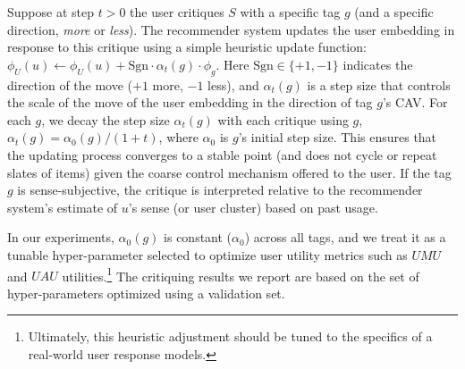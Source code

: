 \documentclass[manuscript,screen,nonacm]{acmart}
\newcommand{\1}{{\mathbf 1}}
\newcommand{\UAU}{\mathit{UAU}}
\newcommand{\UMU}{\mathit{UMU}}
\theoremstyle{TheoremNum}
\begin{document}
Suppose at step $t>0$ the user critiques $S$ with a specific tag $g$ (and a specific direction, \emph{more} or \emph{less}). The recommender system updates the user embedding in response to this critique using a simple heuristic update function: $\phi_U(u) \leftarrow \phi_U(u) + \text{Sgn}\cdot\alpha_t(g) \cdot \phi_g$. Here $\text{Sgn}\in\{+1, -1\}$ indicates the direction of the move ($+1$ more,  $-1$ less), and $\alpha_t(g)$ is a step size that controls the scale of the move of the user embedding in the direction of tag $g$'s CAV. For each $g$, we decay the step size $\alpha_t(g)$ with each critique using $g$, $\alpha_t(g) = \alpha_0(g) / (1 + t)$, where $\alpha_0$ is $g$'s initial step size. This ensures that the updating process converges to a stable point (and does not cycle or repeat slates of items) given the coarse control mechanism offered to the user. 
If the tag $g$ is sense-subjective, the critique is interpreted relative to the recommender system's estimate of $u$'s sense (or user cluster) based on past usage.

In our experiments, $\alpha_0(g)$ is constant ($\alpha_0$) across all tags, and we treat it as a tunable hyper-parameter selected to optimize user utility metrics such as $\UMU$ and $\UAU$ utilities.\footnote{Ultimately, this heuristic adjustment should be tuned to the specifics of a real-world user response models.} 
The critiquing results we report are based on the set of hyper-parameters optimized using a validation set. 
\end{document}
